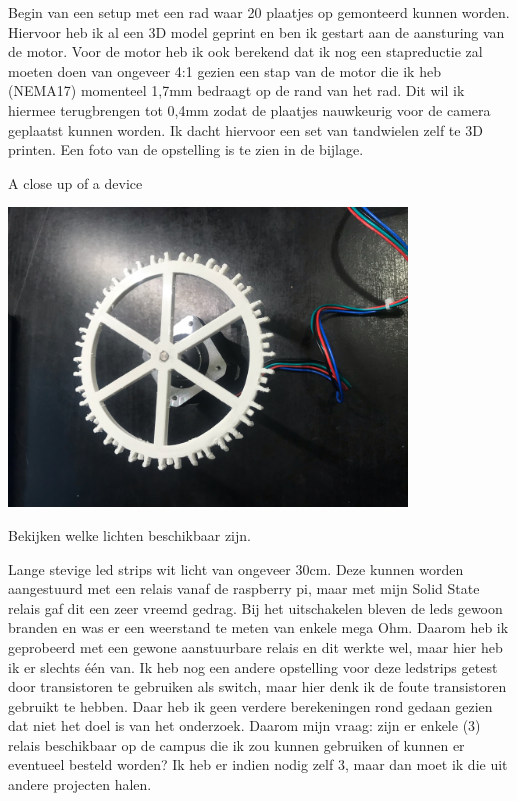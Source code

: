 \documentclass{scrartcl}
\begin{document}
Begin van een setup met een rad waar 20 plaatjes op gemonteerd kunnen worden. Hiervoor heb ik al een 3D model geprint en ben ik gestart aan de aansturing van de motor. Voor de motor heb ik ook berekend dat ik nog een stapreductie zal moeten doen van ongeveer 4:1 gezien een stap van de motor die ik heb (NEMA17) momenteel 1,7mm bedraagt op de rand van het rad. Dit wil ik hiermee terugbrengen tot 0,4mm zodat de plaatjes nauwkeurig voor de camera geplaatst kunnen worden. Ik dacht hiervoor een set van tandwielen zelf te 3D printen. Een foto van de opstelling is te zien in de bijlage.

A close up of a device



\includegraphics[width=4.166667in, keepaspectratio=true]{./Masterproef_Tool_Wear_Inspection_-_Update_2_DH/radhouder_horizontal.jpeg}

Bekijken welke lichten beschikbaar zijn.

Lange stevige led strips wit licht van ongeveer 30cm. Deze kunnen worden aangestuurd met een relais vanaf de raspberry pi, maar met mijn Solid State relais gaf dit een zeer vreemd gedrag. Bij het uitschakelen bleven de leds gewoon branden en was er een weerstand te meten van enkele mega Ohm. Daarom heb ik geprobeerd met een gewone aanstuurbare relais en dit werkte wel, maar hier heb ik er slechts één van. Ik heb nog een andere opstelling voor deze ledstrips getest door transistoren te gebruiken als switch, maar hier denk ik de foute transistoren gebruikt te hebben. Daar heb ik geen verdere berekeningen rond gedaan gezien dat niet het doel is van het onderzoek. Daarom mijn vraag: zijn er enkele (3) relais beschikbaar op de campus die ik zou kunnen gebruiken of kunnen er eventueel besteld worden? Ik heb er indien nodig zelf 3, maar dan moet ik die uit andere projecten halen.
\end{document}
